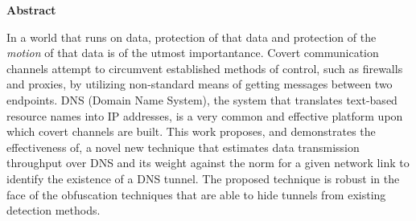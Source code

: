 \begin{center}
\textbf{\large Abstract}
\end{center}

In a world that runs on data, protection of that data and protection of the \emph{motion} of that data is of the utmost importantance. Covert communication channels attempt to circumvent established methods of control, such as firewalls and proxies, by utilizing non-standard means of getting messages between two endpoints. DNS (Domain Name System), the system that translates text-based resource names into IP addresses, is a very common and effective platform upon which covert channels are built. This work proposes, and demonstrates the effectiveness of, a novel new technique that estimates data transmission throughput over DNS and its weight against the norm for a given network link to identify the existence of a DNS tunnel. The proposed technique is robust in the face of the obfuscation techniques that are able to hide tunnels from existing detection methods.


% 
% 
